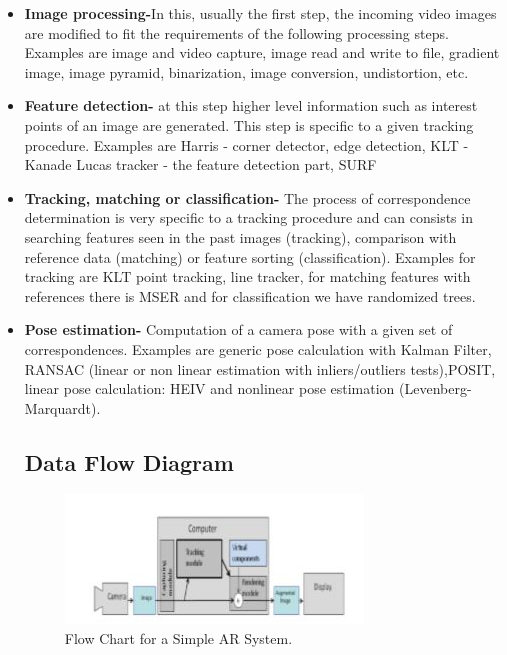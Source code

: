 \documentclass{article}
\begin{document}
\begin{itemize}
\item \textbf{Image processing-}In this, usually the ﬁrst step, the incoming video images are modiﬁed to ﬁt the requirements of the following processing steps. Examples are image and video capture, image read and write to ﬁle, gradient image, image pyramid, binarization, image conversion, undistortion, etc. 
\item \textbf{Feature detection-} at this step higher level information such as interest points of an image are generated. This step is speciﬁc to a given tracking procedure. Examples are Harris - corner detector, edge detection, KLT - Kanade Lucas tracker - the feature detection part, SURF 
\item \textbf{Tracking, matching or classiﬁcation-} The process of correspondence determination is very speciﬁc to a tracking procedure and can consists in searching features seen in the past images (tracking), comparison with reference data (matching) or feature sorting (classiﬁcation). Examples for tracking are KLT point tracking, line tracker, for matching features with references there is MSER and for classiﬁcation we have randomized trees.  
\item \textbf{Pose estimation- } Computation of a camera pose with a given set of correspondences. Examples are generic pose calculation with Kalman Filter, RANSAC (linear or non linear estimation with inliers/outliers tests),POSIT, linear pose calculation: HEIV and nonlinear pose estimation (Levenberg-Marquardt). 

\subsection{Data Flow Diagram}
\begin{figure}[h]
	\includegraphics[width=\linewidth]{flowchart.jpg}
	\caption{Flow Chart for a Simple AR System. }
\end{figure}
\end{itemize}
\end{document}
